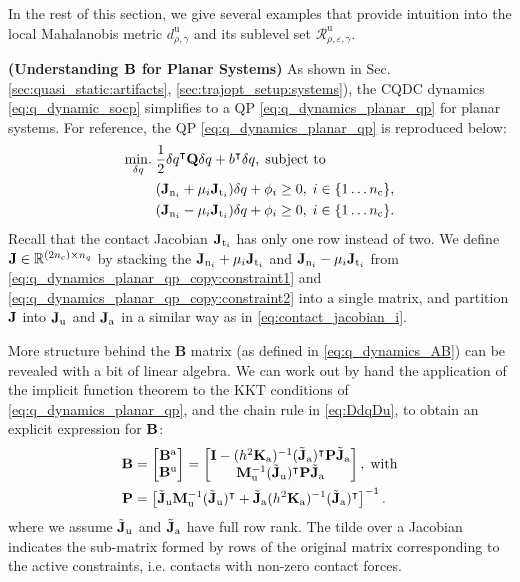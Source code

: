 In the rest of this section, we give several examples that provide intuition into the local Mahalanobis metric $d^\mathrm{u}_{\rho,\gamma}$ and its sublevel set $\mathcal{R}^\mathrm{u}_{\rho,\varepsilon,\gamma}$. 

\begin{example} \normalfont \textbf{(Understanding $\B$ for Planar Systems)}
As shown in Sec. \ref{sec:quasi_static:artifacts}, \ref{sec:trajopt_setup:systems}), the CQDC dynamics \eqref{eq:q_dynamic_socp} simplifies to a QP \eqref{eq:q_dynamics_planar_qp} for planar systems. For reference, the QP \eqref{eq:q_dynamics_planar_qp} is reproduced below:
\begin{subequations}
\label{eq:q_dynamics_planar_qp_copy}
\begin{align}
\underset{\dq}{\minimize} \; &\frac{1}{2} \dq^\intercal \mathbf{Q} \dq + b^\intercal \dq, \; \text{subject to} \\
&(\Jn[i] + \mu_i \Jt[i]) \dq + \phi_i \geq 0, \; i \in \{1\dots\nC\}, \label{eq:q_dynamics_planar_qp_copy:constraint1}\\
&(\Jn[i] - \mu_i \Jt[i]) \dq + \phi_i \geq 0, \; i \in \{1\dots\nC\}. \label{eq:q_dynamics_planar_qp_copy:constraint2}
\end{align}
\end{subequations}
Recall that the contact Jacobian $\Jt[i]$ has only one row instead of two. We define $\J \in \R[(2\nC) \times n_q]$ by stacking the $\Jn[i] + \mu_i \Jt[i]$ and $\Jn[i] - \mu_i \Jt[i]$ from \eqref{eq:q_dynamics_planar_qp_copy:constraint1} and \eqref{eq:q_dynamics_planar_qp_copy:constraint2} into a single matrix, and partition $\J$ into $\Ju$ and $\Ja$ in a similar way as in \eqref{eq:contact_jacobian_i}.

More structure behind the $\mathbf{B}$ matrix (as defined in \eqref{eq:q_dynamics_AB}) can be revealed with a bit of linear algebra. We can work out by hand the application of the implicit function theorem to the KKT conditions of \eqref{eq:q_dynamics_planar_qp}, and the chain rule in \eqref{eq:DdqDu}, to obtain an explicit expression for $\B$:
\begin{subequations}
\label{eq:planar_B_structure}
\begin{align}
\mathbf{B} &=
\begin{bmatrix}
\Ba \\ 
\Bu
\end{bmatrix}
=
\begin{bmatrix}
\mathbf{I} - (h^2\Ka)^{-1} (\JaActive)^\intercal \mathbf{P} \JaActive \\
\Mu^{-1} (\JuActive)^\intercal \mathbf{P} \JaActive
\end{bmatrix}, \; \text{with}\\
\mathbf{P} &= \left[\JuActive \Mu^{-1} (\JuActive)^\intercal + \JaActive (h^2 \Ka)^{-1} (\JaActive)^{\intercal} \right]^{-1}.
\end{align}
\end{subequations}
where we assume $\JuActive$ and $\JaActive$ have full row rank. The tilde over a Jacobian indicates the sub-matrix formed by rows of the original matrix corresponding to the active constraints, i.e. contacts with non-zero contact forces.


\end{example}
